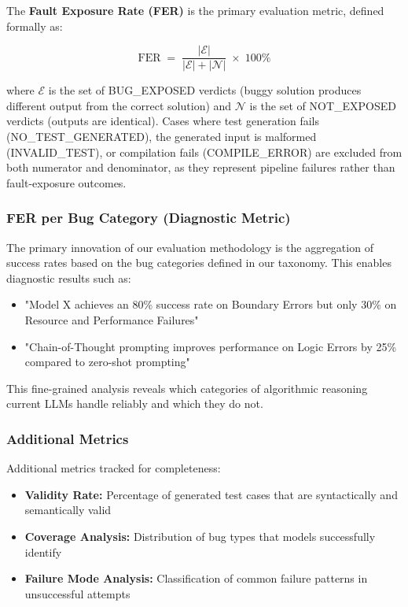 The \textbf{Fault Exposure Rate (FER)} is the primary evaluation metric, defined formally as:

\begin{equation}
\text{FER} \;=\; \frac{|\mathcal{E}|}{|\mathcal{E}| + |\mathcal{N}|} \;\times\; 100\%
\label{eq:fer}
\end{equation}

where $\mathcal{E}$ is the set of \textsc{BUG\_EXPOSED} verdicts (buggy solution produces different output from the correct solution) and $\mathcal{N}$ is the set of \textsc{NOT\_EXPOSED} verdicts (outputs are identical). Cases where test generation fails (\textsc{NO\_TEST\_GENERATED}), the generated input is malformed (\textsc{INVALID\_TEST}), or compilation fails (\textsc{COMPILE\_ERROR}) are excluded from both numerator and denominator, as they represent pipeline failures rather than fault-exposure outcomes.

\subsubsection{FER per Bug Category (Diagnostic Metric)}

The primary innovation of our evaluation methodology is the aggregation of success rates based on the bug categories defined in our taxonomy. This enables diagnostic results such as:

\begin{itemize}
    \item "Model X achieves an 80\% success rate on Boundary Errors but only 30\% on Resource and Performance Failures"
    \item "Chain-of-Thought prompting improves performance on Logic Errors by 25\% compared to zero-shot prompting"
\end{itemize}

This fine-grained analysis reveals which categories of algorithmic reasoning current LLMs handle reliably and which they do not.

\subsubsection{Additional Metrics}

Additional metrics tracked for completeness:

\begin{itemize}
    \item \textbf{Validity Rate:} Percentage of generated test cases that are syntactically and semantically valid
    \item \textbf{Coverage Analysis:} Distribution of bug types that models successfully identify
    \item \textbf{Failure Mode Analysis:} Classification of common failure patterns in unsuccessful attempts
\end{itemize}

